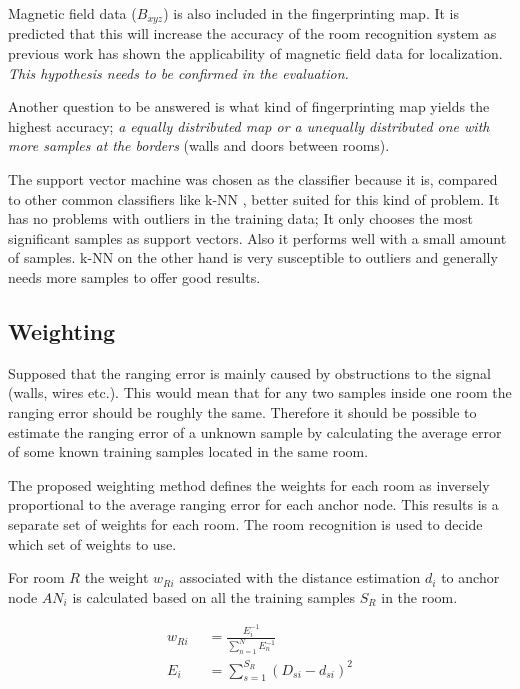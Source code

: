 Magnetic field data ($B_{xyz}$) is also included in the fingerprinting map. It is predicted that this will increase the accuracy of the room recognition system as previous work has shown the applicability of  magnetic field data for localization. \emph{This hypothesis needs to be confirmed in the evaluation.}

Another question to be answered is what kind of fingerprinting map yields the highest accuracy; \emph{a equally distributed map or a unequally distributed one with more samples at the borders }(walls and doors between rooms).

The support vector machine was chosen as the classifier because it is, compared to other common classifiers like k-NN , better suited for this kind of problem. It has no problems with outliers in the training data; It only chooses the most significant samples as support vectors. Also it performs well with a small amount of samples. k-NN on the other hand is very susceptible to outliers and generally needs more samples to offer good results.

\subsection{Weighting}

Supposed that the ranging error is mainly caused by obstructions to the signal (walls, wires etc.). This would mean that for any two samples inside one room the ranging error should be roughly the same. Therefore it should be possible to estimate the ranging error of a unknown sample by calculating the average error of some known training samples located in the same room.

The proposed weighting method defines the weights for each room as inversely proportional to the average ranging error for each anchor node. This results is a separate set of weights for each room. The room recognition is used to decide which set of weights to use.

For room $R$ the weight $w_{Ri}$ associated with the distance estimation $d_i$ to anchor node $AN_i$ is calculated based on all the training samples $S_R$ in the room.

\begin{equation}
\begin{split}
w_{Ri}\;\; & =\frac{E_i^{-1}}{\sum_{n=1}^{N}{E_n^{-1}}}\\
E_i\;\; & = \sum_{s=1}^{S_R}{(D_{si}-d_{si})^2}
\end{split}
\label{eqn: Room Weights}
\end{equation}

